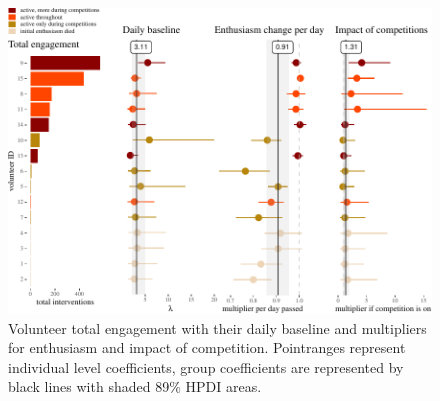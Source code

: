 \documentclass[
  10pt,
  dvipsnames, enabledeprecatedfontcommands]{scrartcl}
\begin{document}
\begin{figure}

\begin{center}\includegraphics[width=2.5\linewidth,angle=90]{reportVolunteers_files/figure-latex/fig:volunteersModel17-1} \end{center}
\caption{Volunteer total engagement with their daily baseline and multipliers for enthusiasm and impact of competition. Pointranges represent individual level coefficients, group coefficients are represented by black lines with shaded 89\% HPDI areas.}
\label{fig:volunteersModel}
\end{figure}
\end{document}
